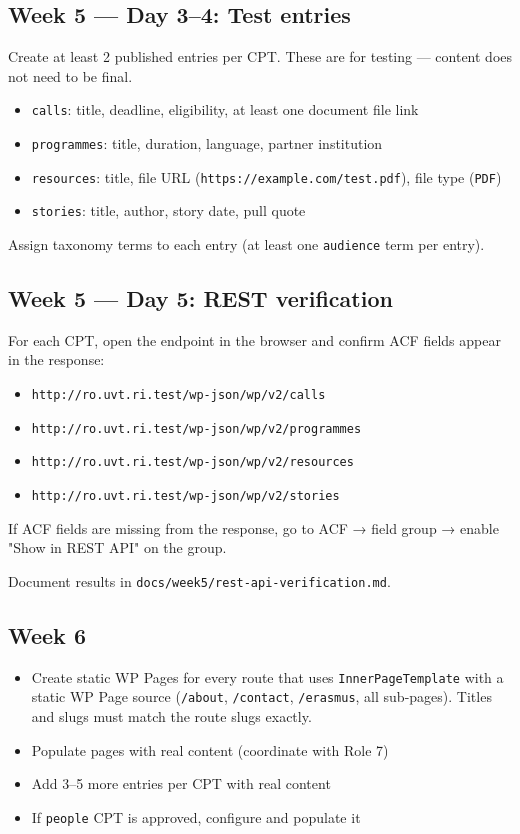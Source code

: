 \documentclass[11pt,a4paper]{article}
\begin{document}
\subsection{Week 5 — Day 3–4: Test entries}

Create at least 2 published entries per CPT. These are for testing — content does not need to be final.

\begin{itemize}
\item \nolinkurl{calls}: title, deadline, eligibility, at least one document file link
\item \nolinkurl{programmes}: title, duration, language, partner institution
\item \nolinkurl{resources}: title, file URL (\nolinkurl{https://example.com/test.pdf}), file type (\nolinkurl{PDF})
\item \nolinkurl{stories}: title, author, story date, pull quote
\end{itemize}

Assign taxonomy terms to each entry (at least one \nolinkurl{audience} term per entry).

\subsection{Week 5 — Day 5: REST verification}

For each CPT, open the endpoint in the browser and confirm ACF fields appear in the response:
\begin{itemize}
\item \nolinkurl{http://ro.uvt.ri.test/wp-json/wp/v2/calls}
\item \nolinkurl{http://ro.uvt.ri.test/wp-json/wp/v2/programmes}
\item \nolinkurl{http://ro.uvt.ri.test/wp-json/wp/v2/resources}
\item \nolinkurl{http://ro.uvt.ri.test/wp-json/wp/v2/stories}
\end{itemize}

If ACF fields are missing from the response, go to ACF → field group → enable "Show in REST API" on the group.

Document results in \nolinkurl{docs/week5/rest-api-verification.md}.

\subsection{Week 6}

\begin{itemize}
\item Create static WP Pages for every route that uses \nolinkurl{InnerPageTemplate} with a static WP Page source (\nolinkurl{/about}, \nolinkurl{/contact}, \nolinkurl{/erasmus}, all sub-pages). Titles and slugs must match the route slugs exactly.
\item Populate pages with real content (coordinate with Role 7)
\item Add 3–5 more entries per CPT with real content
\item If \nolinkurl{people} CPT is approved, configure and populate it
\end{itemize}
\end{document}
